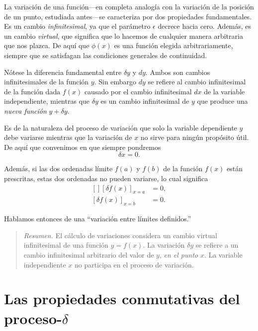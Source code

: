 \documentclass[12pt,a4paper]{book}
\begin{document}
La variación de una función---en completa analogía con la variación de la posición de un punto, estudiada antes---se caracteriza por dos propiedades fundamentales. Es un cambio \textit{infinitesimal}, ya que el parámetro $\epsilon$ decrece hacia cero. Además, es un cambio \textit{virtual}, que significa que lo hacemos de cualquier manera arbitraria que nos plazca. De aquí que $\phi(x)$ es una función elegida arbitrariamente, siempre que se satisfagan las condiciones generales de continuidad.

Nótese la diferencia fundamental entre $\delta y$ y $dy$. Ambos son cambios infinitesimales de la función $y$. Sin embargo $dy$ se refiere al cambio infinitesimal de la función dada $f(x)$ causado por el cambio infinitesimal $dx$ de la variable independiente, mientras que $\delta y$ es un cambio infinitesimal de $y$ que produce una \textit{nueva función} $y + \delta y$.

Es de la naturaleza del proceso de variación que solo la variable dependiente $y$ debe variarse mientras que la variación de $x$ no sirve para ningún propósito útil. De aquí que convenimos en que siempre pondremos
\begin{equation}
\delta x = 0. \tag{28.3}
\end{equation}

Además, si las dos ordenadas límite $f(a)$ y $f(b)$ de la función $f(x)$ están prescritas, estas dos ordenadas no pueden variarse, lo cual significa
\begin{equation}
\begin{aligned}[]
[\delta f(x)]_{x=a} &= 0, \\
[\delta f(x)]_{x=b} &= 0.
\end{aligned} \tag{28.4}
\end{equation}

Hablamos entonces de una ``variación entre límites definidos.''

\begin{quote}
\textit{Resumen.} El cálculo de variaciones considera un cambio virtual infinitesimal de una función $y = f(x)$. La variación $\delta y$ se refiere a un cambio infinitesimal arbitrario del valor de $y$, \textit{en el punto} $x$. La variable independiente $x$ no participa en el proceso de variación.
\end{quote}

\section{Las propiedades conmutativas del proceso-$\delta$}
\end{document}
